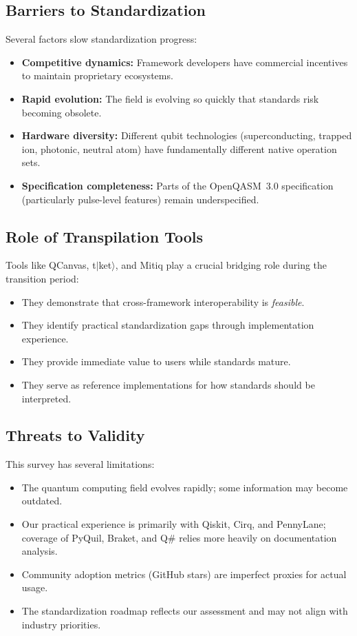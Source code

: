 \documentclass[journal]{IEEEtran}
\begin{document}
\subsection{Barriers to Standardization}

Several factors slow standardization progress:

\begin{itemize}
    \item \textbf{Competitive dynamics:} Framework developers have commercial incentives to maintain proprietary ecosystems.
    \item \textbf{Rapid evolution:} The field is evolving so quickly that standards risk becoming obsolete.
    \item \textbf{Hardware diversity:} Different qubit technologies (superconducting, trapped ion, photonic, neutral atom) have fundamentally different native operation sets.
    \item \textbf{Specification completeness:} Parts of the OpenQASM~3.0 specification (particularly pulse-level features) remain underspecified.
\end{itemize}

\subsection{Role of Transpilation Tools}

Tools like QCanvas, t$|$ket$\rangle$, and Mitiq play a crucial bridging role during the transition period:
\begin{itemize}
    \item They demonstrate that cross-framework interoperability is \emph{feasible}.
    \item They identify practical standardization gaps through implementation experience.
    \item They provide immediate value to users while standards mature.
    \item They serve as reference implementations for how standards should be interpreted.
\end{itemize}

\subsection{Threats to Validity}

This survey has several limitations:
\begin{itemize}
    \item The quantum computing field evolves rapidly; some information may become outdated.
    \item Our practical experience is primarily with Qiskit, Cirq, and PennyLane; coverage of PyQuil, Braket, and Q\# relies more heavily on documentation analysis.
    \item Community adoption metrics (GitHub stars) are imperfect proxies for actual usage.
    \item The standardization roadmap reflects our assessment and may not align with industry priorities.
\end{itemize}
\end{document}
